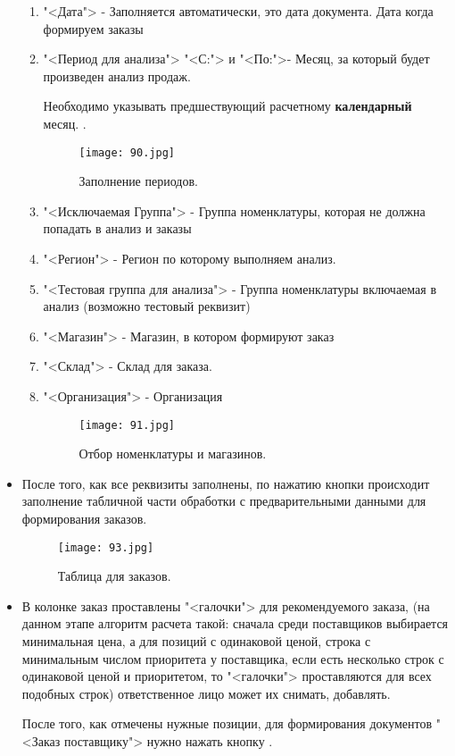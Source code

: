 \begin{itemize}
	\begin{enumerate}[I]
		\item "<Дата"> - Заполняется автоматически, это дата документа. Дата когда формируем заказы
		\item "<Период для анализа">  "<С:">  и "<По:">- Месяц, за который будет произведен анализ продаж.\par
		Необходимо указывать предшествующий расчетному \textbf{календарный} месяц.		
		.
		\begin{figure}[H]
			\texttt{[image: 90.jpg]}
			\caption{Заполнение периодов.}
			\label{ris:90.jpg}
		\end{figure}
		\item "<Исключаемая Группа"> - Группа номенклатуры, которая не должна попадать в анализ и заказы
		\item "<Регион"> - Регион по которому выполняем анализ.		
		\item "<Тестовая группа для анализа"> - Группа номенклатуры включаемая в анализ (возможно тестовый реквизит)
		\item "<Магазин"> - Магазин, в котором формируют заказ
		\item "<Склад"> - Склад для заказа.		
		\item "<Организация"> - Организация
		\begin{figure}[H]
			\texttt{[image: 91.jpg]}
			\caption{Отбор номенклатуры и магазинов.}
			\label{ris:91.jpg}
		\end{figure}		
	\end{enumerate}
	\item После того, как все реквизиты заполнены, по нажатию кнопки  происходит заполнение табличной части обработки с предварительными данными для формирования заказов. 		
	\begin{figure}[H]
		\texttt{[image: 93.jpg]}
		\caption{Таблица для заказов.}
		\label{ris:93.jpg}
	\end{figure}		
	\item В колонке заказ проставлены "<галочки"> для рекомендуемого заказа, (на данном этапе алгоритм расчета такой: сначала среди поставщиков выбирается минимальная цена, а для позиций с одинаковой ценой, строка с минимальным числом приоритета у поставщика, если есть несколько строк с одинаковой ценой и приоритетом, то "<галочки"> проставляются для всех подобных строк) ответственное лицо может их  снимать, добавлять.\par  После того, как отмечены нужные позиции, для формирования документов "<Заказ поставщику"> нужно нажать кнопку .\par

\end{itemize}
